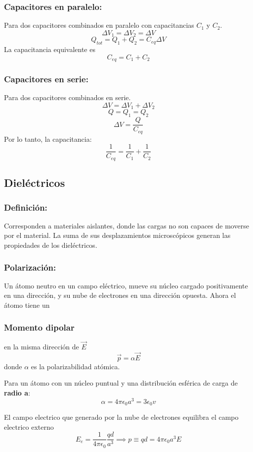 \documentclass[a4paper, 10pt]{article}
\begin{document}
\begin{multicols*}{2}
	\subsubsection{Capacitores en paralelo:} Para dos capacitores combinados en paralelo con capacitancias $C_1$ y $C_2$.
	$$\Delta V_1 = \Delta V_2 = \Delta V$$
	$$Q_{tot} = Q_1 + Q_2 =C_{eq} \Delta V$$
	La capacitancia equivalente es
	$$C_{eq}=C_1 + C_2$$
	    
	\subsubsection{Capacitores en serie:} Para dos capacitores combinados en serie.
	$$\Delta V =\Delta V_1 + \Delta V_2 $$
	$$Q = Q_1 = Q_2$$
	$$\Delta V = \frac{Q}{C_{eq}}$$
	Por lo tanto, la capacitancia:
	$$ \frac{1}{C_{eq}} = \frac{1}{C_1}+\frac{1}{C_2}$$
	    
	    
	\subsection*{Dieléctricos}
	\subsubsection{Definición:} Corresponden a materiales aislantes, donde las cargas no son capaces de moverse por el material. La suma de sus desplazamientos microscópicos generan las propiedades de los dieléctricos.
	    
	\subsubsection{Polarización:} Un átomo neutro en un campo eléctrico, mueve su núcleo cargado positivamente en una dirección, y su nube de electrones en una dirección opuesta. Ahora el átomo tiene un \subsubsection{Momento dipolar} en la misma dirección de $\vec{E}$ $$\vec{p}= \alpha \vec{E}$$
	donde $\alpha$ es la polarizabilidad atómica.
	    
	Para un átomo con un núcleo puntual y
  una distribución esférica de carga de \textbf{radio a}:
	$$\alpha = 4 \pi \epsilon_0 a^3 = 3 \epsilon_0 v$$
	     
	El campo electrico que generado por la nube de electrones equilibra el campo electrico externo $$E_e = \frac{1}{4 \pi \epsilon _0} \frac{qd}{a^3} \implies p \equiv qd = 4 \pi \epsilon_0a^3E$$
	    

\end{multicols*}
\end{document}
